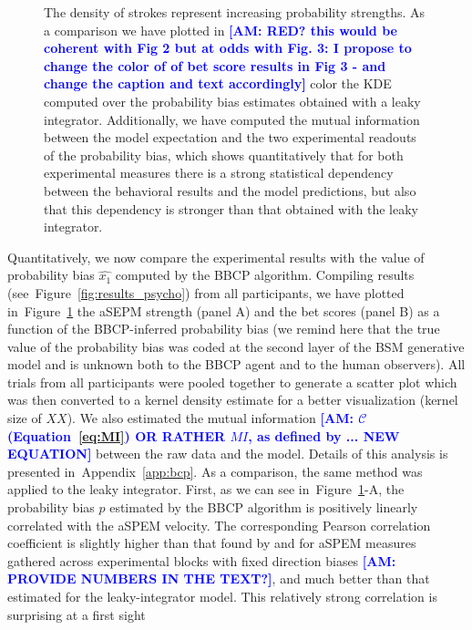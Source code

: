 \documentclass[12pt,english]{article}%
\newcommand{\Cc}{\mathcal{C}}
\newcommand{\citet}[1]{\textcite{#1}}
\newcommand{\seeFig}[1]{Figure~\ref{fig:#1}}
\newcommand{\seeEq}[1]{Equation~\ref{eq:#1}}
\newcommand{\seeApp}[1]{Appendix~\ref{app:#1}}
\newcommand{\AM}[1]{\textbf{\textcolor{blue}{[AM: #1]}}}
\begin{document}
\begin{figure}
{The density of strokes represent increasing probability strengths.
As a comparison we have plotted in \AM{RED? this would be coherent with Fig 2 but at odds with Fig. 3: I propose to change the color of of bet score results in Fig 3 - and change the caption and text accordingly} color the KDE computed over
the probability bias estimates obtained with a leaky integrator.
Additionally, we have computed the mutual information between the model expectation and the two experimental readouts of the probability bias, which
shows quantitatively that for both experimental measures
there is a strong statistical dependency between
the behavioral results and the model predictions,
but also that this dependency is stronger than that obtained
with the leaky integrator.
}
\label{fig:results_psycho_all}
\end{figure}
Quantitatively, we now compare the experimental results
with the value of probability bias $\hat{x_1}$
computed by the BBCP algorithm.
Compiling results (see~\seeFig{results_psycho}) from all participants,
we have plotted in~\seeFig{results_psycho_all}
the aSEPM strength (panel A) and the bet scores (panel B) as a function of the BBCP-inferred probability bias
(we remind here that the true value of the probability bias was coded at the second layer of the BSM generative model and is unknown both to the BBCP agent and to the human observers).
All trials from all participants were pooled together to generate a scatter plot
which was then  converted to a kernel density estimate
for a better visualization (kernel size of $XX$).
We also estimated the mutual information \AM{$\Cc$ (\seeEq{MI}) OR RATHER $MI$, as defined by ... NEW EQUATION}
between the raw data and the model.
Details of this analysis is presented in~\seeApp{bcp}.
As a comparison, the same method was applied to the leaky integrator.
First, as we can see in~\seeFig{results_psycho_all}-A,
the probability bias $\hat{p}$ estimated by the BBCP algorithm
is positively linearly correlated with the aSPEM velocity.
The corresponding Pearson correlation coefficient
is slightly higher than that found by
\citet{Montagnini2010} and \citet{Damasse18} for aSPEM measures gathered across experimental blocks with fixed direction biases \AM{PROVIDE NUMBERS IN THE TEXT?},
and much better than that estimated for the leaky-integrator model.
This relatively strong correlation is surprising at a first sight
\end{document}
